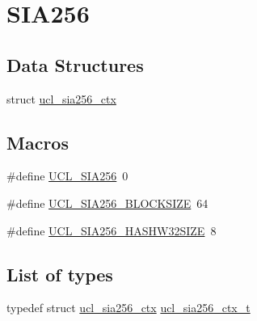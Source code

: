 \hypertarget{group___u_c_l___s_i_a256}{}\section{S\+I\+A256}
\label{group___u_c_l___s_i_a256}
\subsection*{Data Structures}
\begin{DoxyCompactItemize}
\item 
struct \hyperlink{group___u_c_l___s_i_a256_structucl__sia256__ctx}{ucl\+\_\+sia256\+\_\+ctx}
\end{DoxyCompactItemize}
\subsection*{Macros}
\begin{DoxyCompactItemize}
\item 
\#define \hyperlink{group___u_c_l___s_i_a256_gaea9532ac144a90f3ee34ae129ed68282}{U\+C\+L\+\_\+\+S\+I\+A256}~0
\item 
\#define \hyperlink{group___u_c_l___s_i_a256_ga34283058845b7379a0d481372e2ad4d9}{U\+C\+L\+\_\+\+S\+I\+A256\+\_\+\+B\+L\+O\+C\+K\+S\+I\+ZE}~64
\item 
\#define \hyperlink{group___u_c_l___s_i_a256_gafaca6ff0632649a744923a29c7d197f1}{U\+C\+L\+\_\+\+S\+I\+A256\+\_\+\+H\+A\+S\+H\+W32\+S\+I\+ZE}~8
\end{DoxyCompactItemize}
\subsection*{List of types}
\begin{DoxyCompactItemize}
\item 
typedef struct \hyperlink{group___u_c_l___s_i_a256_structucl__sia256__ctx}{ucl\+\_\+sia256\+\_\+ctx} \hyperlink{group___u_c_l___s_i_a256_ga17e23ec55cac2194659d2b08c2a3f4ca}{ucl\+\_\+sia256\+\_\+ctx\+\_\+t}
\end{DoxyCompactItemize}
